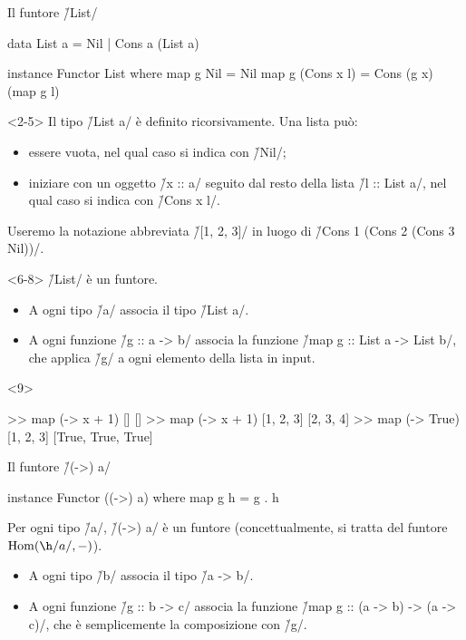 \begin{frame}[fragile]{\secname}{Il funtore \h/List/}
\begin{overlayarea}{\textwidth}{0.7\textheight}
\begin{haskellcode}
data List a = Nil | Cons a (List a)

instance Functor List where
    map g Nil = Nil
    map g (Cons x l) = Cons (g x) (map g l)
\end{haskellcode}

\begin{onlyenv}<2-5>
Il tipo \h/List a/ è definito ricorsivamente. Una lista può:
\pause
\begin{itemize}[<+(1)->]
\item essere vuota, nel qual caso si indica con \h/Nil/;
\item iniziare con un oggetto \h/x :: a/ seguito dal resto della lista \h/l :: List a/, nel qual caso si indica con \h/Cons x l/.
\end{itemize}
\pause
Useremo la notazione abbreviata \h/[1, 2, 3]/ in luogo di
\h/Cons 1 (Cons 2 (Cons 3 Nil))/.
\end{onlyenv}

\begin{onlyenv}<6-8>
\h/List/ è un funtore.
\pause
\begin{itemize}[<+(1)->]
\item A ogni tipo \h/a/ associa il tipo \h/List a/.
\item A ogni funzione \h/g :: a -> b/ associa la funzione \h/map g :: List a -> List b/, che applica \h/g/ a ogni elemento della lista in input.
\end{itemize}
\end{onlyenv}

\begin{onlyenv}<9>
\begin{runhaskell}
>>  map (\x -> x + 1) []
    []
>>  map (\x -> x + 1) [1, 2, 3]
    [2, 3, 4]
>>  map (\x -> True) [1, 2, 3]
    [True, True, True]
\end{runhaskell}
\end{onlyenv}
\end{overlayarea}
\end{frame}

\begin{frame}[fragile]{\secname}{Il funtore \h/(->) a/}
\begin{haskellcode}
instance Functor ((->) a) where
    map g h = g . h
\end{haskellcode}
\pause

Per ogni tipo \h/a/, \h/(->) a/ è un funtore (concettualmente, si tratta del funtore $\Hom(\h/a/,-)$).
\begin{itemize}[<+(1)->]
\item A ogni tipo \h/b/ associa il tipo \h/a -> b/.
\item A ogni funzione \h/g :: b -> c/ associa la funzione \h/map g :: (a -> b) -> (a -> c)/, che è semplicemente la composizione con \h/g/.
\end{itemize}
\end{frame}

